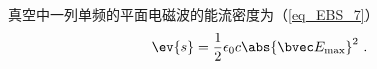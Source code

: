 
真空中一列单频的平面电磁波的能流密度为（\autoref{eq_EBS_7}）
\begin{equation}
\ev{s} = \frac{1}{2} \epsilon_0 c \abs{\bvec E_\text{max}}^2~.
\end{equation}

